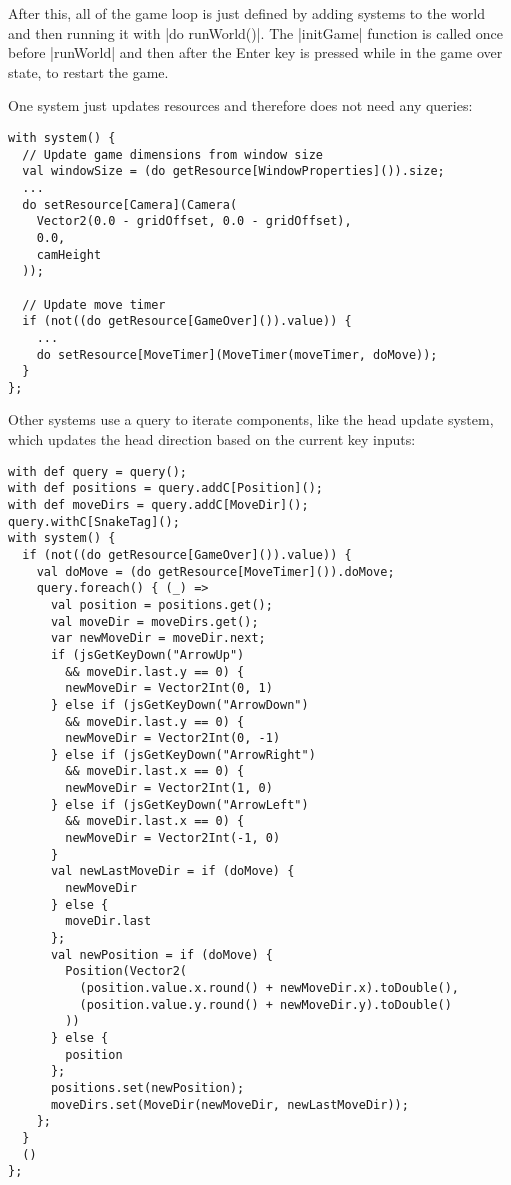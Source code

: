 After this, all of the game loop is just defined by adding systems to the world and then running it with |do runWorld()|. The |initGame| function is called once before |runWorld| and then after the Enter key is pressed while in the game over state, to restart the game.

One system just updates resources and therefore does not need any queries:

\begin{lstlisting}
with system() {
  // Update game dimensions from window size
  val windowSize = (do getResource[WindowProperties]()).size;
  ...
  do setResource[Camera](Camera(
    Vector2(0.0 - gridOffset, 0.0 - gridOffset),
    0.0,
    camHeight
  ));

  // Update move timer
  if (not((do getResource[GameOver]()).value)) {
	...
    do setResource[MoveTimer](MoveTimer(moveTimer, doMove));
  }
};
\end{lstlisting}

Other systems use a query to iterate components, like the head update system, which updates the head direction based on the current key inputs:

\begin{lstlisting}
with def query = query();
with def positions = query.addC[Position]();
with def moveDirs = query.addC[MoveDir]();
query.withC[SnakeTag]();
with system() {
  if (not((do getResource[GameOver]()).value)) {
    val doMove = (do getResource[MoveTimer]()).doMove;
    query.foreach() { (_) =>
      val position = positions.get();
      val moveDir = moveDirs.get();
      var newMoveDir = moveDir.next;
      if (jsGetKeyDown("ArrowUp")
	  	&& moveDir.last.y == 0) {
        newMoveDir = Vector2Int(0, 1)
      } else if (jsGetKeyDown("ArrowDown")
	  	&& moveDir.last.y == 0) {
        newMoveDir = Vector2Int(0, -1)
      } else if (jsGetKeyDown("ArrowRight")
	  	&& moveDir.last.x == 0) {
        newMoveDir = Vector2Int(1, 0)
      } else if (jsGetKeyDown("ArrowLeft")
		&& moveDir.last.x == 0) {
        newMoveDir = Vector2Int(-1, 0)
      }
      val newLastMoveDir = if (doMove) {
        newMoveDir
      } else {
        moveDir.last
      };
      val newPosition = if (doMove) {
        Position(Vector2(
          (position.value.x.round() + newMoveDir.x).toDouble(),
          (position.value.y.round() + newMoveDir.y).toDouble()
        ))
      } else {
        position
      };
      positions.set(newPosition);
      moveDirs.set(MoveDir(newMoveDir, newLastMoveDir));
    };
  }
  ()
};
\end{lstlisting}

